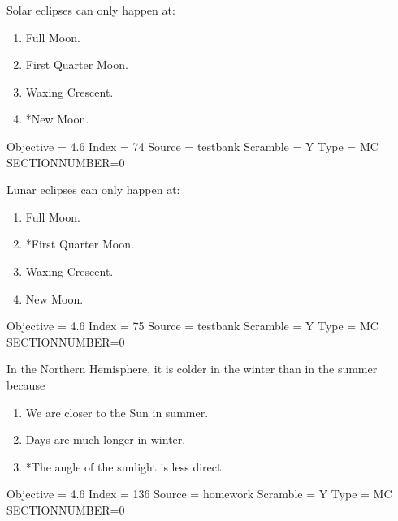 \documentclass[11pt]{article}
\begin{document}
\begin{enumerate}
\begin{minipage}{\textwidth}
\begin{minipage}{\textwidth}
\item Solar eclipses can only happen at:
\begin{multicols}{3}
\begin{enumerate} 
\setlength{\itemsep}{1pt} 
\setlength{\parskip}{0pt} 
\setlength{\parsep}{0pt}
\setlength{\multicolsep}{1pt} 
\item Full Moon.
\item First Quarter Moon.
\item Waxing Crescent.
\item *New Moon.
\end{enumerate} 
\vfill 
\end{multicols}

Objective = 4.6
Index = 74
Source = testbank
Scramble = Y
Type = MC
SECTIONNUMBER=0
\end{minipage}
\end{minipage}
\vskip 0.20in

\begin{minipage}{\textwidth}
\begin{minipage}{\textwidth}
\item Lunar eclipses can only happen at:
\begin{multicols}{3}
\begin{enumerate} 
\setlength{\itemsep}{1pt} 
\setlength{\parskip}{0pt} 
\setlength{\parsep}{0pt}
\setlength{\multicolsep}{1pt} 
\item Full Moon.
\item *First Quarter Moon.
\item Waxing Crescent.
\item New Moon.
\end{enumerate} 
\vfill 
\end{multicols}

Objective = 4.6
Index = 75
Source = testbank
Scramble = Y
Type = MC
SECTIONNUMBER=0
\end{minipage}
\end{minipage}
\vskip 0.20in

\begin{minipage}{\textwidth}
\begin{minipage}{\textwidth}
\item In the Northern Hemisphere, it is colder in the winter than in the summer because \underline{\hspace{0.5in}}
\begin{enumerate} 
\setlength{\itemsep}{1pt} 
\setlength{\parskip}{0pt} 
\setlength{\parsep}{0pt}
\setlength{\multicolsep}{1pt} 
\item We are closer to the Sun in summer.
\item Days are much longer in winter.
\item *The angle of the sunlight is less direct.
\end{enumerate} 
Objective = 4.6
Index = 136
Source = homework
Scramble = Y
Type = MC
SECTIONNUMBER=0
\end{minipage}
\end{minipage}
\vskip 0.20in


\end{enumerate}
\end{document}
